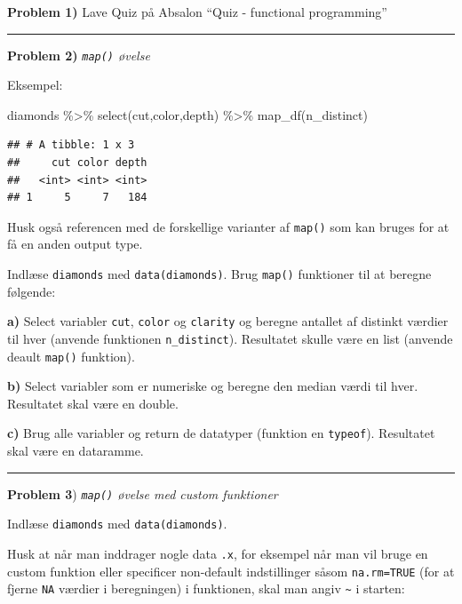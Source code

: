 \documentclass[
]{book}
\newenvironment{Shaded}{\begin{snugshade}}{\end{snugshade}}
\newcommand{\FunctionTok}[1]{\textcolor[rgb]{0.00,0.00,0.00}{#1}}
\newcommand{\NormalTok}[1]{#1}
\newcommand{\SpecialCharTok}[1]{\textcolor[rgb]{0.00,0.00,0.00}{#1}}
\begin{document}
\textbf{Problem 1)} Lave Quiz på Absalon ``Quiz - functional programming''

\begin{center}\rule{0.5\linewidth}{0.5pt}\end{center}

\textbf{Problem 2)} \emph{\texttt{map()} øvelse}

Eksempel:

\begin{Shaded}
\begin{Highlighting}[]
\NormalTok{diamonds }\SpecialCharTok{\%\textgreater{}\%} \FunctionTok{select}\NormalTok{(cut,color,depth) }\SpecialCharTok{\%\textgreater{}\%} \FunctionTok{map\_df}\NormalTok{(n\_distinct)}
\end{Highlighting}
\end{Shaded}

\begin{verbatim}
## # A tibble: 1 x 3
##     cut color depth
##   <int> <int> <int>
## 1     5     7   184
\end{verbatim}

Husk også referencen med de forskellige varianter af \texttt{map()} som kan bruges for at få en anden output type.

Indlæse \texttt{diamonds} med \texttt{data(diamonds)}. Brug \texttt{map()} funktioner til at beregne følgende:

\textbf{a)} Select variabler \texttt{cut}, \texttt{color} og \texttt{clarity} og beregne antallet af distinkt værdier til hver (anvende funktionen \texttt{n\_distinct}). Resultatet skulle være en list (anvende deault \texttt{map()} funktion).

\textbf{b)} Select variabler som er numeriske og beregne den median værdi til hver. Resultatet skal være en double.

\textbf{c)} Brug alle variabler og return de datatyper (funktion en \texttt{typeof}). Resultatet skal være en dataramme.

\begin{center}\rule{0.5\linewidth}{0.5pt}\end{center}

\textbf{Problem 3}) \emph{\texttt{map()} øvelse med custom funktioner}

Indlæse \texttt{diamonds} med \texttt{data(diamonds)}.

Husk at når man inddrager nogle data \texttt{.x}, for eksempel når man vil bruge en custom funktion eller specificer non-default indstillinger såsom \texttt{na.rm=TRUE} (for at fjerne \texttt{NA} værdier i beregningen) i funktionen, skal man angiv \texttt{\textasciitilde{}} i starten:
\end{document}
